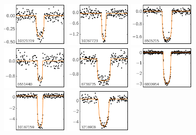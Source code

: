 \includegraphics[width=0.25\textwidth]{figures/lcs/10321319.pdf}
\includegraphics[width=0.25\textwidth]{figures/lcs/10287723.pdf}
\includegraphics[width=0.25\textwidth]{figures/lcs/8505215.pdf}
\includegraphics[width=0.25\textwidth]{figures/lcs/6551440.pdf}
\includegraphics[width=0.25\textwidth]{figures/lcs/8738735.pdf}
\includegraphics[width=0.25\textwidth]{figures/lcs/8800954.pdf}
\includegraphics[width=0.25\textwidth]{figures/lcs/10187159.pdf}
\includegraphics[width=0.25\textwidth]{figures/lcs/3218908.pdf}
